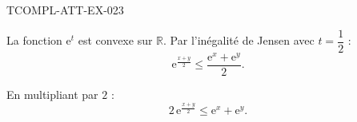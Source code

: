 \begin{corrige}{TCOMPL-ATT-EX-023}

La fonction $\mathrm{e}^t$ est convexe sur $\mathbb{R}$. Par l'inégalité de Jensen avec $t = \dfrac{1}{2}$ :
\[ \mathrm{e}^{\frac{x+y}{2}} \leq \frac{\mathrm{e}^x + \mathrm{e}^y}{2}. \]


En multipliant par $2$ :
\[ 2\,\mathrm{e}^{\frac{x+y}{2}} \leq \mathrm{e}^x + \mathrm{e}^y. \]

\end{corrige}
